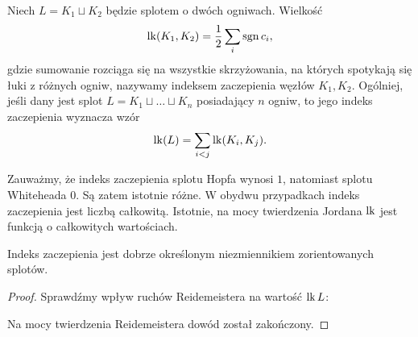 \begin{definition}
    Niech $L = K_1 \sqcup K_2$ będzie splotem o dwóch ogniwach.
    Wielkość
    \begin{equation}
        \operatorname{lk}(K_1, K_2) = \frac 12 \sum_i \operatorname{sgn} c_i,
    \end{equation}
    gdzie sumowanie rozciąga się na wszystkie skrzyżowania, na których spotykają się łuki z różnych ogniw, nazywamy indeksem zaczepienia węzłów $K_1, K_2$.
    Ogólniej, jeśli dany jest splot $L = K_1 \sqcup \ldots \sqcup K_n$ posiadający $n$ ogniw, to jego indeks zaczepienia wyznacza wzór
    \begin{equation}
        \operatorname{lk}(L) = \sum_{i < j} \operatorname{lk}(K_i, K_j).
    \end{equation}
\end{definition}

Zauważmy, że indeks zaczepienia splotu Hopfa wynosi $1$, natomiast splotu Whiteheada $0$.
%
%
Są zatem istotnie różne.
W obydwu przypadkach indeks zaczepienia jest liczbą całkowitą.
Istotnie, na mocy twierdzenia Jordana $\operatorname{lk}$ jest funkcją o całkowitych wartościach.

\begin{proposition}
    Indeks zaczepienia jest dobrze określonym niezmiennikiem zorientowanych splotów.
\end{proposition}

\begin{proof}
    Sprawdźmy wpływ ruchów Reidemeistera na wartość $\operatorname{lk} L$:
\begin{comment}
    \begin{figure}[H]
    \centering
    \begin{minipage}[b]{.3\linewidth}
        \[
            \MedLarReidemeisterOneLeft \cong \MedLarReidemeisterOneStraight
        \]
        \subcaption{ruch $R_1$}
    \end{minipage}
    \begin{minipage}[b]{.3\linewidth}
        \[
            \MedLarReidemeisterTwoLinkingA \cong \MedLarReidemeisterTwoB
        \]
        \subcaption{ruch $R_2$}
    \end{minipage}
    \begin{minipage}[b]{.35\linewidth}
        \[
            \MedLarReidemeisterThreeLinkingA \cong \MedLarReidemeisterThreeLinkingB
        \]
        \subcaption{ruch $R_3$}
    \end{minipage}
\end{figure}
\end{comment}
    Na mocy twierdzenia Reidemeistera dowód został zakończony.
\end{proof}



